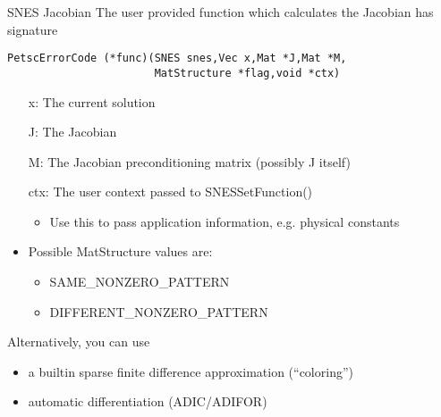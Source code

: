 \begin{frame}[fragile]{SNES Jacobian}
The user provided function which calculates the Jacobian has signature
\begin{verbatim}
PetscErrorCode (*func)(SNES snes,Vec x,Mat *J,Mat *M,
                       MatStructure *flag,void *ctx)
\end{verbatim}

\begin{itemize}
  \item[{\kb x}:] The current solution
  \item[{\kb J}:] The Jacobian
  \item[{\kb M}:] The Jacobian preconditioning matrix (possibly J itself)
  \item[{\kb ctx}:] The user context passed to {\kb SNESSetFunction()}
  \begin{itemize}
    \item Use this to pass application information, e.g. physical constants
  \end{itemize}

  \item Possible {\kb MatStructure} values are:
  \begin{itemize}
    \item SAME\_NONZERO\_PATTERN
    \item DIFFERENT\_NONZERO\_PATTERN
  \end{itemize}
\end{itemize}

Alternatively, you can use
\begin{itemize}
  \item a builtin sparse finite difference approximation (``coloring'')
  \item automatic differentiation (ADIC/ADIFOR)
\end{itemize}

\end{frame}
